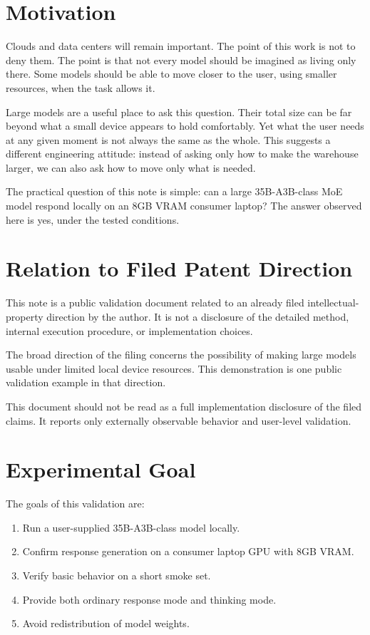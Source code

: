 \documentclass[11pt]{article}
\begin{document}
\section{Motivation}

Clouds and data centers will remain important. The point of this work is not to deny them. The point is that not every model should be imagined as living only there. Some models should be able to move closer to the user, using smaller resources, when the task allows it.

Large models are a useful place to ask this question. Their total size can be far beyond what a small device appears to hold comfortably. Yet what the user needs at any given moment is not always the same as the whole. This suggests a different engineering attitude: instead of asking only how to make the warehouse larger, we can also ask how to move only what is needed.

The practical question of this note is simple: can a large 35B-A3B-class MoE model respond locally on an 8GB VRAM consumer laptop? The answer observed here is yes, under the tested conditions.

\section{Relation to Filed Patent Direction}

This note is a public validation document related to an already filed intellectual-property direction by the author. It is not a disclosure of the detailed method, internal execution procedure, or implementation choices.

The broad direction of the filing concerns the possibility of making large models usable under limited local device resources. This demonstration is one public validation example in that direction.

This document should not be read as a full implementation disclosure of the filed claims. It reports only externally observable behavior and user-level validation.

\section{Experimental Goal}

The goals of this validation are:

\begin{enumerate}[leftmargin=1.5em]
  \item Run a user-supplied 35B-A3B-class model locally.
  \item Confirm response generation on a consumer laptop GPU with 8GB VRAM.
  \item Verify basic behavior on a short smoke set.
  \item Provide both ordinary response mode and thinking mode.
  \item Avoid redistribution of model weights.
\end{enumerate}
\end{document}
